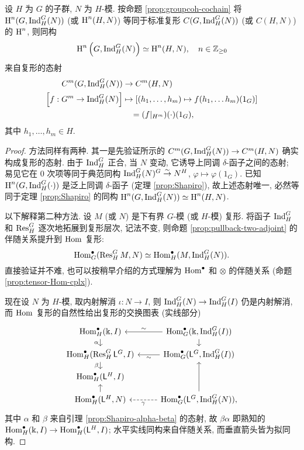 \begin{proposition}\label{prop:Shapiro-std-coh}
	设 $H$ 为 $G$ 的子群, $N$ 为 $H$-模. 按命题 \ref{prop:groupcoh-cochain} 将 $\operatorname{H}^n(G, \operatorname{Ind}^G_H(N))$ (或 $\operatorname{H}^n(H, N)$) 等同于标准复形 $C(G, \operatorname{Ind}^G_H(N))$ (或 $C(H, N)$) 的 $\operatorname{H}^n$, 则同构
	\[ \operatorname{H}^n\left(G, \operatorname{Ind}^G_H(N)\right) \simeq \operatorname{H}^n(H, N), \quad n \in \mathbb{Z}_{\geq 0} \]
	来自复形的态射
	\begin{align*}
		C^m(G, \operatorname{Ind}^G_H(N)) & \to C^m(H, N) \\
		\left[ f: G^m \to \operatorname{Ind}^G_H(N) \right] & \mapsto \left[ (h_1, \ldots, h_m) \mapsto f(h_1, \ldots h_m)(1_G) \right] \\
		& \quad = (f|_{H^m})(\cdot)(1_G),
	\end{align*}
	其中 $h_1, \ldots, h_m \in H$.
\end{proposition}
\begin{proof}
	方法同样有两种. 其一是先验证所示的 $C^m(G, \operatorname{Ind}^G_H(N)) \to C^m(H, N)$ 确实构成复形的态射. 由于 $\operatorname{Ind}^G_H$ 正合, 当 $N$ 变动, 它诱导上同调 $\delta$-函子之间的态射; 易见它在 $0$ 次项等同于典范同构 $\operatorname{Ind}^G_H(N)^G \stackrel{\sim}{\rightarrow} N^H$, $\varphi \mapsto \varphi(1_G)$. 已知 $\operatorname{H}^n(G, \operatorname{Ind}^G_H(\cdot))$ 是泛上同调 $\delta$-函子 (定理 \ref{prop:Shapiro}), 故上述态射唯一, 必然等同于定理 \ref{prop:Shapiro} 的同构 $\operatorname{H}^n(G, \operatorname{Ind}^G_H(N)) \simeq \operatorname{H}^n(H, N)$.
	
	以下解释第二种方法. 设 $M$ (或 $N$) 是下有界 $G$-模 (或 $H$-模) 复形. 将函子 $\operatorname{Ind}^G_H$ 和 $\operatorname{Res}^G_H$ 逐次地拓展到复形层次, 记法不变, 则命题 \ref{prop:pullback-two-adjoint} 的伴随关系提升到 $\operatorname{Hom}$ 复形:
	\[ \operatorname{Hom}^\bullet_G(\operatorname{Res}^G_H M, N) \simeq \operatorname{Hom}^\bullet_H(M, \operatorname{Ind}^G_H(N)). \]
	直接验证并不难, 也可以按稍早介绍的方式理解为 $\operatorname{Hom}^\bullet$ 和 $\otimes$ 的伴随关系 (命题 \ref{prop:tensor-Hom-cplx}).
	
	现在设 $N$ 为 $H$-模, 取内射解消 $\iota: N \to I$, 则 $\operatorname{Ind}^G_H(N) \to \operatorname{Ind}^G_H(I)$ 仍是内射解消, 而 $\operatorname{Hom}$ 复形的自然性给出复形的交换图表 (实线部分)
	\begin{equation}\label{eqn:Shapiro-explicit-diagram}\begin{tikzcd}[row sep=small]
		\Hom^\bullet_H(\Bbbk, I) \arrow[d, "\alpha"'] & \Hom^\bullet_G(\Bbbk, \Ind^G_H(I)) \arrow[l, "\sim"'] \arrow[d] \\
		\Hom^\bullet_H(\Res^G_H \mathsf{L}^G, I) \arrow[d, "\beta"'] & \Hom^\bullet_G(\mathsf{L}^G, \Ind^G_H(I)) \arrow[l, "\sim"] \\
		\Hom^\bullet_H(\mathsf{L}^H, I) & \\
		\Hom^\bullet_H(\mathsf{L}^H, N) \arrow[u] & \Hom^\bullet_G(\mathsf{L}^G, \Ind^G_H(N)), \arrow[uu] \arrow[dashed, l, "\gamma"]
	\end{tikzcd}\end{equation}
	其中 $\alpha$ 和 $\beta$ 来自引理 \ref{prop:Shapiro-alpha-beta} 的态射, 故 $\beta\alpha$ 即熟知的 $\operatorname{Hom}^\bullet_H(\Bbbk, I) \to \operatorname{Hom}^\bullet_H(\mathsf{L}^H, I)$; 水平实线同构来自伴随关系, 而垂直箭头皆为拟同构.
	

\end{proof}
